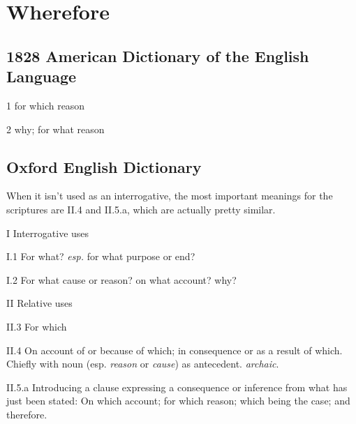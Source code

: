 \section{Wherefore}
	\label{WHEREFORE}
	

\subsection{1828 American Dictionary of the English Language} %
	\label{WHEREFORE-1828}

	\begin{compactitem}
		\item[1] for which reason
		\item[2] why; for what reason
	\end{compactitem}

\subsection{Oxford English Dictionary} %
	\label{WHEREFORE-OED}
	
	When it isn't used as an interrogative, the most important meanings for the scriptures are II.4 and II.5.a, which are actually pretty similar.

	\begin{compactitem}
		\item[I] Interrogative uses
		\item[I.1] For what? \textit{esp.} for what purpose or end?
		\item[I.2] For what cause or reason? on what account? why?
		\item[II] Relative uses
		\item[II.3] For which
		\item[II.4] On account of or because of which; in consequence or as a result of which. Chiefly with noun (esp. \textit{reason} or \textit{cause}) as antecedent. \textit{archaic}.
		\item[II.5.a] Introducing a clause expressing a consequence or inference from what has just been stated: On which account; for which reason; which being the case; and therefore.
	\end{compactitem}

